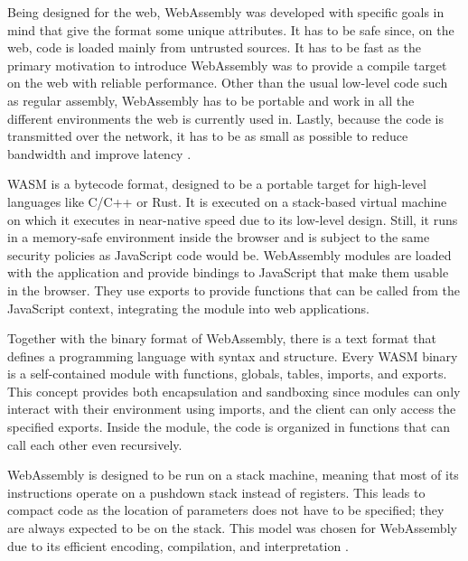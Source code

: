 
Being designed for the web, WebAssembly was developed with specific goals in mind that give the format some unique attributes. It has to be safe since, on the web, code is loaded mainly from untrusted sources. It has to be fast as the primary motivation to introduce WebAssembly was to provide a compile target on the web with reliable performance. Other than the usual low-level code such as regular assembly, WebAssembly has to be portable and work in all the different environments the web is currently used in. Lastly, because the code is transmitted over the network, it has to be as small as possible to reduce bandwidth and improve latency \autocite{rossberg_bringing_2018}.

WASM is a bytecode format, designed to be a portable target for high-level languages like C/C++ or Rust. It is executed on a stack-based virtual machine on which it executes in near-native speed due to its low-level design. Still, it runs in a memory-safe environment inside the browser and is subject to the same security policies as JavaScript code would be. WebAssembly modules are loaded with the application and provide bindings to JavaScript that make them usable in the browser. They use exports to provide functions that can be called from the JavaScript context, integrating the module into web applications.

Together with the binary format of WebAssembly, there is a text format that defines a programming language with syntax and structure. Every WASM binary is a self-contained module with functions, globals, tables, imports, and exports. This concept provides both encapsulation and sandboxing since modules can only interact with their environment using imports, and the client can only access the specified exports. Inside the module, the code is organized in functions that can call each other even recursively.

WebAssembly is designed to be run on a stack machine, meaning that most of its instructions operate on a pushdown stack instead of registers. This leads to compact code as the location of parameters does not have to be specified; they are always expected to be on the stack. This model was chosen for WebAssembly due to its efficient encoding, compilation, and interpretation \autocite{noauthor_design_nodate}.

